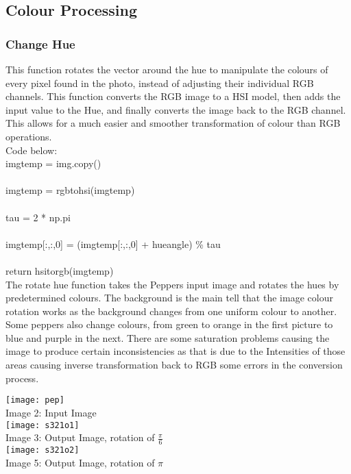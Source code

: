 \documentclass{article}
\begin{document}
	\subsection{Colour Processing}
	
	
	\subsubsection{Change Hue}
	
	This function rotates the vector around the hue to manipulate the colours of every pixel found in the photo, instead of adjusting their individual RGB channels. This function converts the RGB image to a HSI model, then adds the input value to the Hue, and finally converts the image back to the RGB channel. This allows for a much easier and smoother transformation of colour than RGB operations.\\
	
	Code below:\\
	
	\noindent img\textunderscore temp = img.copy()\\
	\\
	\indent img\textunderscore temp = rgb\textunderscore to\textunderscore hsi(img\textunderscore temp)\\
	\\
	\indent tau = 2 * np.pi\\
	\\
	\indent img\textunderscore temp[:,:,0] = (img\textunderscore temp[:,:,0] + hue\textunderscore angle) \% tau\\
	\\
	\indent return hsi\textunderscore to\textunderscore rgb(img\textunderscore temp)\\
	
	The rotate hue function takes the Peppers input image and rotates the hues by predetermined colours. The background is the main tell that the image colour rotation works as the background changes from one uniform colour to another. Some peppers also change colours, from green to orange in the first picture to blue and purple in the next. There are some saturation problems causing the image to produce certain inconsistencies as that is due to the Intensities of those areas causing inverse transformation back to RGB some errors in the conversion process.\\
	
	\begin{center}
		\noindent \texttt{[image: pep]}\\
		Image 2: Input Image\\
		
		\noindent \texttt{[image: s321o1]}\\
		Image 3: Output Image, rotation of $\frac{\pi}{6}$\\
		
		\noindent \texttt{[image: s321o2]}\\
		Image 5: Output Image, rotation of $\pi$\\
	\end{center}
	
\end{document}
